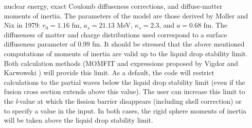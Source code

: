 \documentclass[twocolumn,amsmath,amssymb,10pt,groupedaddress,a4paper]{revtex4}
\begin{document}
nuclear energy, exact Coulomb diffuseness corrections, and diffuse-matter
moments of inertia. The parameters of the model are those derived
by Moller and Nix in 1979: $r_{0}=1.16$ fm, $a_{s}=21.13$ MeV, $\kappa_{s}=2.3$,
and $a=0.68$ fm. The diffuseness of matter and charge distributions
used correspond to a surface diffuseness parameter of 0.99 fm.
It should be stressed that the above mentioned computations of moments
of inertia are valid up to the liquid drop stability limit. Both calculation
methods (MOMFIT and expressions proposed by Vigdor and Karwowski \cite{VK})
will provide this limit. As a default, the code will restrict calculations
to the partial waves below the liquid drop stability limit (even if
the fusion cross section extends above this value). The user can increase
this limit to the \emph{l}-value at which the fission barrier disappears
(including shell correction) or to specify a value in the input. In
both cases, the rigid sphere moments of inertia will be taken above
the liquid drop stability limit.
\end{document}
